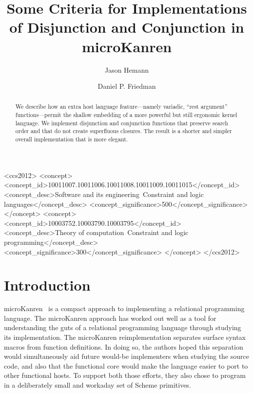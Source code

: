 \documentclass[sigplan,draft,natbib=false]{acmart}
\begin{document}
\title[Some Criteria for Implementations of conj and disj in
microKanren]{Some Criteria for Implementations of Disjunction and
  Conjunction in microKanren}

\author{Jason Hemann}
\author{Daniel P. Friedman}

\renewcommand{\shortauthors}{Hemann et al.}

\begin{abstract}
  We describe how an extra host language feature---namely variadic,
  \enquote{rest argument} functions---permit the shallow embedding of
  a more powerful but still ergonomic kernel language. We implement
  disjunction and conjunction functions that preserve search order and
  that do not create superfluous closures. The result is a shorter and
  simpler overall implementation that is more elegant.
\end{abstract}

\begin{CCSXML}
<ccs2012>
   <concept>
       <concept_id>10011007.10011006.10011008.10011009.10011015</concept_id>
       <concept_desc>Software and its engineering~Constraint and logic languages</concept_desc>
       <concept_significance>500</concept_significance>
   </concept>
   <concept>
       <concept_id>10003752.10003790.10003795</concept_id>
       <concept_desc>Theory of computation~Constraint and logic programming</concept_desc>
       <concept_significance>300</concept_significance>
   </concept>
 </ccs2012>
\end{CCSXML}



\maketitle

\section{Introduction}

microKanren~\cite{hemann2013muKanren} is a compact approach to
implementing a relational programming language. The microKanren
approach has worked out well as a tool for understanding the guts of a
relational programming language through studying its implementation.
The microKanren reimplementation separates surface syntax macros from
function definitions. In doing so, the authors hoped this separation
would simultaneously aid future would-be implementers when studying
the source code, and also that the functional core would make the
language easier to port to other functional hosts. To support both
those efforts, they also chose to program in a deliberately small and
workaday set of Scheme primitives.
\end{document}
